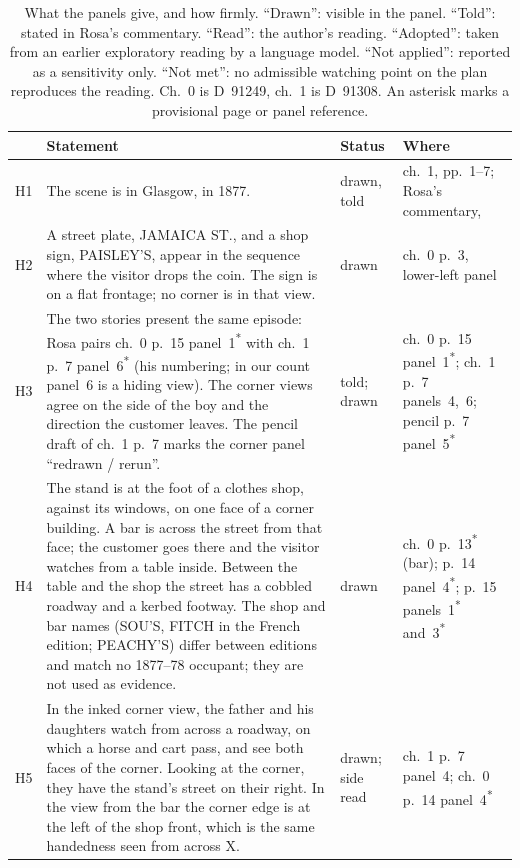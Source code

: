 \documentclass[10pt,a4paper]{article}
\begin{document}
\begin{table}[tbp]\centering\small
\caption{What the panels give, and how firmly. ``Drawn'': visible in the panel. ``Told'': stated in Rosa's commentary. ``Read'': the author's reading. ``Adopted'': taken from an earlier exploratory reading by a language model. ``Not applied'': reported as a sensitivity only. ``Not met'': no admissible watching point on the plan reproduces the reading. Ch.~0 is D~91249, ch.~1 is D~91308. An asterisk marks a provisional page or panel reference.}\label{tab:hyp}
\begin{tabular}{>{\raggedright\arraybackslash}p{0.6cm}>{\raggedright\arraybackslash}p{8.3cm}>{\raggedright\arraybackslash}p{1.5cm}>{\raggedright\arraybackslash}p{3.8cm}}
\toprule
 & Statement & Status & Where \\
\midrule
H1 & The scene is in Glasgow, in 1877. & drawn, told & ch.~1, pp.~1--7; Rosa's commentary, \citet[p.~25]{rosa2012glenat2} \\
H2 & A street plate, JAMAICA ST., and a shop sign, PAISLEY'S, appear in the sequence where the visitor drops the coin. The sign is on a flat frontage; no corner is in that view. & drawn & ch.~0 p.~3, lower-left panel \\
H3 & The two stories present the same episode: Rosa pairs ch.~0 p.~15 panel~1\textsuperscript{*} with ch.~1 p.~7 panel~6\textsuperscript{*} (his numbering; in our count panel~6 is a hiding view). The corner views agree on the side of the boy and the direction the customer leaves. The pencil draft of ch.~1 p.~7 marks the corner panel ``redrawn / rerun''. & told; drawn & ch.~0 p.~15 panel~1\textsuperscript{*}; ch.~1 p.~7 panels~4,~6; pencil p.~7 panel~5\textsuperscript{*} \\
H4 & The stand is at the foot of a clothes shop, against its windows, on one face of a corner building. A bar is across the street from that face; the customer goes there and the visitor watches from a table inside. Between the table and the shop the street has a cobbled roadway and a kerbed footway. The shop and bar names (SOU'S, FITCH in the French edition; PEACHY'S) differ between editions and match no 1877--78 occupant; they are not used as evidence. & drawn & ch.~0 p.~13\textsuperscript{*} (bar); p.~14 panel~4\textsuperscript{*}; p.~15 panels~1\textsuperscript{*} and~3\textsuperscript{*} \\
H5 & In the inked corner view, the father and his daughters watch from across a roadway, on which a horse and cart pass, and see both faces of the corner. Looking at the corner, they have the stand's street on their right. In the view from the bar the corner edge is at the left of the shop front, which is the same handedness seen from across X. & drawn; side read & ch.~1 p.~7 panel~4; ch.~0 p.~14 panel~4\textsuperscript{*} \\

\end{tabular}
\end{table}
\end{document}

